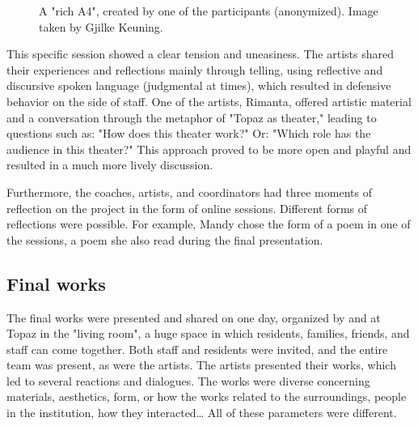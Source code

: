 \documentclass[authordate, empirical,issue]{jote-new-article}
\begin{document}
{\begin{figure}
		\caption{A "rich A4", created by one of the participants (anonymized). Image taken by Gjilke Keuning.}



	\end{figure}













	This specific session showed a clear tension and uneasiness. The artists shared their experiences and reflections mainly through telling, using reflective and discursive spoken language (judgmental at times), which resulted in defensive behavior on the side of staff. One of the artists, Rimanta, offered artistic material and a conversation through the metaphor of "Topaz as theater," leading to questions such as: "How does this theater work?" Or: "Which role has the audience in this theater?" This approach proved to be more open and playful and resulted in a much more lively discussion.







	Furthermore, the coaches, artists, and coordinators had three moments of reflection on the project in the form of online sessions. Different forms of reflections were possible. For example, Mandy chose the form of a poem in one of the sessions, a poem she also read during the final presentation.







	\subsection{Final works}







	The final works were presented and shared on one day, organized by and at Topaz in the "living room", a huge space in which residents, families, friends, and staff can come together. Both staff and residents were invited, and the entire team was present, as were the artists. The artists presented their works, which led to several reactions and dialogues. The works were diverse concerning materials, aesthetics, form, or how the works related to the surroundings, people in the institution, how they interacted… All of these parameters were different.







}
\end{document}

